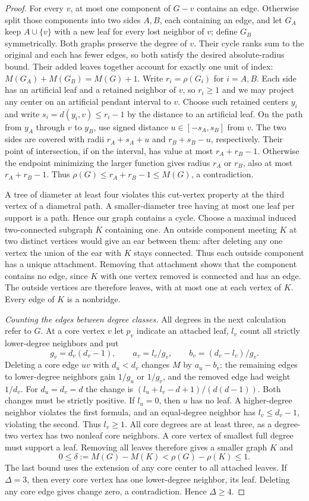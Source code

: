 \documentclass[11pt,a4paper]{article}
\theoremstyle{remark}\newtheorem*{remark}{Remark}
\begin{document}
\begin{proof}
For every $v$, at most one component of $G-v$ contains an edge.
Otherwise split those components into two sides $A,B$, each containing
an edge, and let $G_A$ keep $A\cup\{v\}$ with a new leaf for every
lost neighbor of $v$; define $G_B$ symmetrically. Both graphs preserve
the degree of $v$. Their cycle ranks sum to the original and each
has fewer edges, so both satisfy the desired absolute-radius bound.
Their added leaves together account for exactly one unit of index:
$M(G_A)+M(G_B)=M(G)+1$. Write $r_i=\rho(G_i)$ for $i=A,B$.
Each side has an artificial leaf and a retained neighbor of $v$, so
$r_i\ge1$ and we may project any center on an artificial pendant
interval to $v$. Choose such retained centers $y_i$ and write
$s_i=d(y_i,v)\le r_i-1$ by the distance to an artificial leaf.
On the path from $y_A$ through $v$ to $y_B$, use signed distance
$u\in[-s_A,s_B]$ from $v$. The two sides are covered with radii
$r_A+s_A+u$ and $r_B+s_B-u$, respectively. Their point of intersection,
if on the interval, has value at most $r_A+r_B-1$.
Otherwise the endpoint minimizing the larger function gives radius
$r_A$ or $r_B$, also at most $r_A+r_B-1$. Thus
$\rho(G)\le r_A+r_B-1\le M(G)$, a contradiction.

A tree of diameter at least four violates this cut-vertex property at
the third vertex of a diametral path. A smaller-diameter tree having
at most one leaf per support is a path. Hence our graph contains a
cycle. Choose a maximal induced two-connected subgraph $K$ containing
one. An outside component meeting $K$ at two distinct vertices would
give an ear between them: after deleting any one vertex the union of
the ear with $K$ stays connected. Thus each outside component has a
unique attachment. Removing that attachment shows that the component
contains no edge, since $K$ with one vertex removed is connected and
has an edge. The outside vertices are therefore leaves, with at most
one at each vertex of $K$. Every edge of $K$ is a nonbridge.

\emph{Counting the edges between degree classes.} All degrees in the
next calculation refer to $G$. At a core vertex $v$ let $p_v$ indicate an
attached leaf, $l_v$ count all strictly lower-degree neighbors and put
\[
 g_v=d_v(d_v-1),\qquad
 a_v=l_v/g_v,\qquad b_v=(d_v-l_v)/g_v .
\]
Deleting a core edge $uv$ with $d_u<d_v$ changes $M$ by $a_u-b_v$:
the remaining edges to lower-degree neighbors gain $1/g_u$ or $1/g_v$,
and the removed edge had weight $1/d_v$. For $d_u=d_v=d$ the change is
$(l_u+l_v-d+1)/(d(d-1))$. Both changes must be strictly positive.
If $l_u=0$, then $u$ has no leaf. A higher-degree neighbor violates the
first formula, and an equal-degree neighbor has $l_v\le d_v-1$,
violating the second. Thus $l_v\ge1$. All core degrees are at least
three, as a degree-two vertex has two nonleaf core neighbors. A core
vertex of smallest full degree must support a leaf. Removing all leaves
therefore gives a smaller graph $K$ and
\[
 0\le\delta:=M(G)-M(K)<\rho(G)-\rho(K)\le1 .
\]
The last bound uses the extension of any core center to all attached
leaves. If $\Delta=3$, then every core vertex has one lower-degree
neighbor, its leaf. Deleting any core edge gives change zero, a
contradiction. Hence $\Delta\ge4$.


\end{proof}
\end{document}
